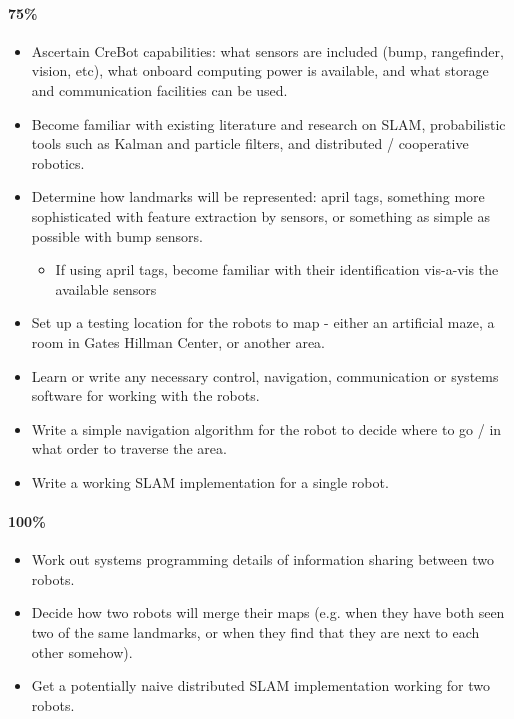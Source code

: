 \documentclass[11pt]{article}
\begin{document}
\paragraph{75\%}
\begin{itemize}
    \item Ascertain CreBot capabilities: what sensors are included (bump, rangefinder, vision, etc), what onboard computing power is available, and what storage and communication facilities can be used.
    \item Become familiar with existing literature and research on SLAM, probabilistic tools such as Kalman and particle filters, and distributed / cooperative robotics.
    \item Determine how landmarks will be represented: april tags, something more sophisticated with feature extraction by sensors, or something as simple as possible with bump sensors.
        \begin{itemize}
            \item If using april tags, become familiar with their identification vis-a-vis the available sensors
        \end{itemize}
    \item Set up a testing location for the robots to map - either an artificial maze, a room in Gates Hillman Center, or another area.
    \item Learn or write any necessary control, navigation, communication or systems software for working with the robots.
    \item Write a simple navigation algorithm for the robot to decide where to go / in what order to traverse the area.
    \item Write a working SLAM implementation for a single robot.
\end{itemize}

\paragraph{100\%}

\begin{itemize}
    \item Work out systems programming details of information sharing between two robots.
    \item Decide how two robots will merge their maps (e.g. when they have both seen two of the same landmarks, or when they find that they are next to each other somehow).
    \item Get a potentially naive distributed SLAM implementation working for two robots.
\end{itemize}
\end{document}
